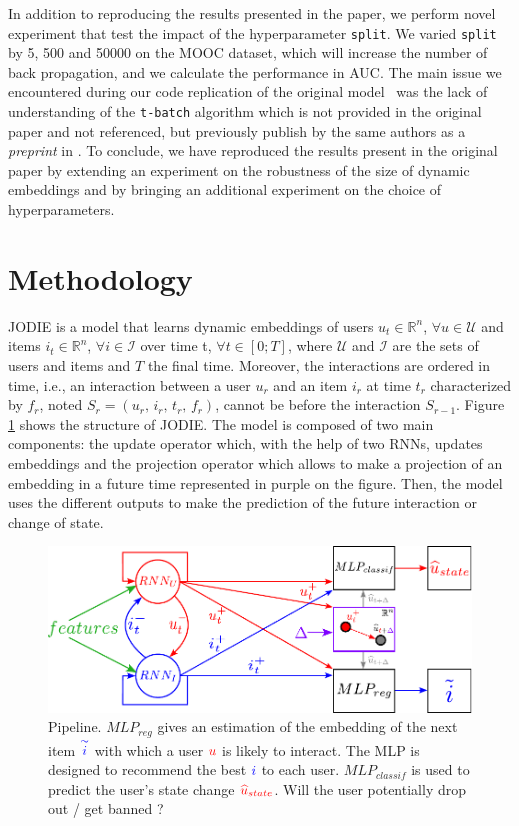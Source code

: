In addition to reproducing the results presented in the paper, we perform novel experiment that test the impact of the hyperparameter \texttt{split}. We varied \texttt{split} by 5, 500 and 50000 on the MOOC dataset, which will increase the number of back propagation, and we calculate the performance in AUC. The main issue we encountered during our code replication of the original model~\cite{kumar2019predicting} was the lack of understanding of the \texttt{t-batch} algorithm which is not provided in the original paper and not referenced, but previously publish by the same authors as a \textit{preprint} in \cite{kumar18}.
To conclude, we have reproduced the results present in the original paper by extending an experiment on the robustness of the size of dynamic embeddings and by bringing an additional experiment on the choice of hyperparameters.

\section*{Methodology}
JODIE is a model that learns dynamic embeddings of users $u_t \in \mathbb{R}^n$, $\forall u \in \mathcal{U}$ and items $i_t \in \mathbb{R}^n$, $\forall i \in \mathcal{I}$ over time t, $\forall t \in [0; T]$, where $\mathcal{U}$ and $\mathcal{I}$ are the sets of users and items and $T$ the final time. Moreover, the interactions are ordered in time, i.e., an interaction between a user $u_r$ and an item $i_r$ at time $t_r$ characterized by $f_r$, noted $S_r = (u_r, \, i_r, \, t_r, \, f_r)$, cannot be before the interaction $S_{r-1}$. Figure \ref{Pipeline} shows the structure of JODIE. The model is composed of two main components: the update operator which, with the help of two RNNs, updates embeddings and the projection operator which allows to make a projection of an embedding in a future time represented in purple on the figure. Then, the model uses the different outputs to make the prediction of the future interaction or change of state.


\begin{figure}[H]
    \begin{center}
        \includegraphics[width=1.0\textwidth]{image/pipeline.pdf}
    \end{center}
    \caption{Pipeline. $MLP_{reg}$ gives an estimation of the embedding of the next item $\textcolor{blue}{\overset{\sim}{i}}$ with which a user $\textcolor{red}{u}$ is likely to interact. The MLP  is designed to recommend the best $\textcolor{blue}{i}$ to each user. $MLP_{classif}$ is used to predict the user's state change $\textcolor{red}{\widehat u_{state}}$. Will the user potentially drop out / get banned ?}
    \label{Pipeline}
\end{figure}

